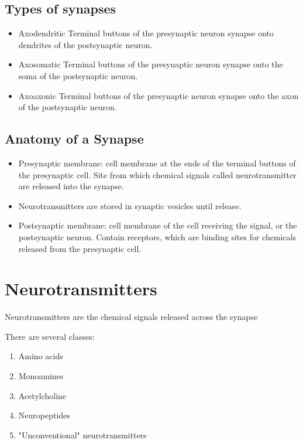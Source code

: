 \documentclass[12pt,a4paper]{article}
\begin{document}
	\subsection{Types of synapses}
	\begin{itemize}
		\item Axodendritic
		\subitem Terminal buttons of the presynaptic neuron synapse onto dendrites of the postsynaptic neuron. 
		\item Axosomatic
		\subitem Terminal buttons of the presynaptic neuron synapse onto the soma of the postsynaptic neuron. 
		\item Axoaxonic
		\subitem Terminal buttons of the presynaptic neuron synapse onto the axon of the postsynaptic neuron. 
	\end{itemize}
	
	\subsection{Anatomy of a Synapse}
	\begin{itemize}
		\item Presynaptic membrane: cell membrane at the ends of the terminal buttons of the presynaptic cell. 
		\subitem Site from which chemical signals called neurotransmitter are released into the synapse. 
		\item Neurotransmitters are stored in synaptic vesicles until release. 
		\item Postsynaptic membrane: cell membrane of the cell receiving the signal, or the postsynaptic neuron. 
		\subitem Contain receptors, which are binding sites for chemicals released from the presynaptic cell. 
	\end{itemize}
	
	\section{Neurotransmitters}
	
	Neurotransmitters are the chemical signals released across the synapse
	
	There are several classes:
	\begin{enumerate}
		\item Amino acids
		\item Monoamines
		\item Acetylcholine 
		\item Neuropeptides
		\item "Unconventional" neurotransmitters
	\end{enumerate}
	
\end{document}
